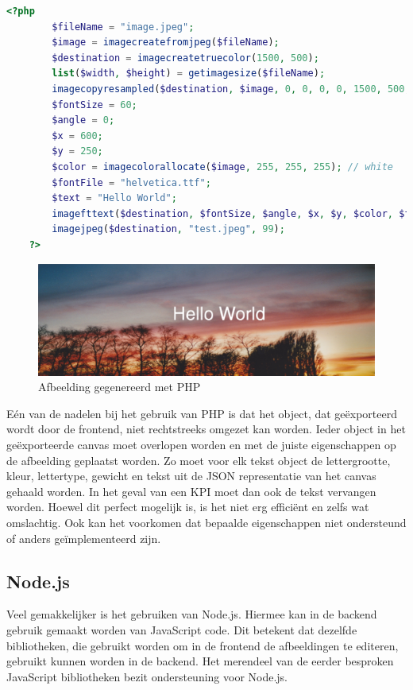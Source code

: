 \begin{lstlisting}[caption={Genereren van een afbeelding in PHP},label=lst:PHPImageGeneration,language=PHP]
	<?php
		$fileName = "image.jpeg";
		$image = imagecreatefromjpeg($fileName);
		$destination = imagecreatetruecolor(1500, 500);
		list($width, $height) = getimagesize($fileName);
		imagecopyresampled($destination, $image, 0, 0, 0, 0, 1500, 500, $width, $height);
		$fontSize = 60;
		$angle = 0;
		$x = 600;
		$y = 250;
		$color = imagecolorallocate($image, 255, 255, 255); // white
		$fontFile = "helvetica.ttf";
		$text = "Hello World";
		imagefttext($destination, $fontSize, $angle, $x, $y, $color, $fontFile, $text);
		imagejpeg($destination, "test.jpeg", 99);
	?>
\end{lstlisting}

\begin{figure}[H]
	\centering
	\includegraphics[width=1\textwidth]{Figuren/PHP_rendering.jpeg}
	\caption{Afbeelding gegenereerd met PHP}
	\label{fig:PHP}
\end{figure} 
%

E\'{e}n van de nadelen bij het gebruik van PHP is dat het object, dat ge\"{e}xporteerd wordt door de frontend, niet rechtstreeks omgezet kan worden. Ieder object in het ge\"{e}xporteerde canvas moet overlopen worden en met de juiste eigenschappen op de afbeelding geplaatst worden. Zo moet voor elk tekst object de lettergrootte, kleur, lettertype, gewicht en tekst uit de JSON representatie van het canvas gehaald worden. In het geval van een KPI moet dan ook de tekst vervangen worden. Hoewel dit perfect mogelijk is, is het niet erg effici\"{e}nt en zelfs wat omslachtig. Ook kan het voorkomen dat bepaalde eigenschappen niet ondersteund of anders ge\"{i}mplementeerd zijn. 

\subsection{Node.js} \label{BackendImplementationNodeJS}
Veel gemakkelijker is het gebruiken van Node.js. Hiermee kan in de backend gebruik gemaakt worden van JavaScript code. Dit betekent dat dezelfde bibliotheken, die gebruikt worden om in de frontend de afbeeldingen te editeren, gebruikt kunnen worden in de backend. Het merendeel van de eerder besproken JavaScript bibliotheken bezit ondersteuning voor Node.js.

